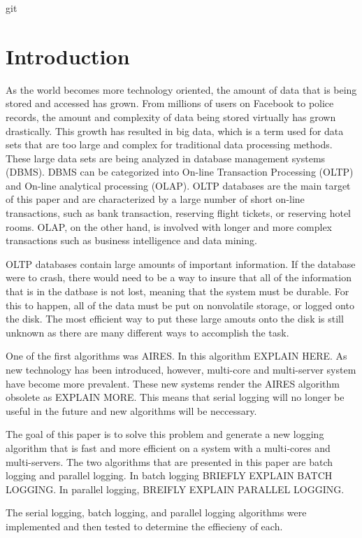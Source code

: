 git \section{Introduction}

As the world becomes more technology oriented, the amount of data that is being stored and accessed has grown. From millions of users on Facebook to police records, the amount and complexity of data being stored virtually has grown drastically. This growth has resulted in big data, which is a term used for data sets that are too large and complex for traditional data processing methods. These large data sets are being analyzed in database management systems (DBMS). DBMS can be categorized into On-line Transaction Processing (OLTP) and On-line analytical processing (OLAP). OLTP databases are the main target of this paper and are characterized by a large number of short on-line transactions, such as bank transaction, reserving flight tickets, or reserving hotel rooms. OLAP, on the other hand, is involved with longer and more complex transactions such as business intelligence and data mining. \newline

OLTP databases contain large amounts of important information. If the database were to crash, there would need to be a way to insure that all of the information that is in the datbase is not lost, meaning that the system must be durable. For this to happen, all of the data must be put on nonvolatile storage, or logged onto the disk. The most efficient way to put these large amouts onto the disk is still unknown as there are many different ways to accomplish the task. \newline

One of the first algorithms was AIRES. In this algorithm EXPLAIN HERE. As new technology has been introduced, however, multi-core and multi-server system have become more prevalent. These new systems render the AIRES algorithm obsolete as EXPLAIN MORE. This means that serial logging will no longer be useful in the future and new algorithms will be neccessary.  \newline

The goal of this paper is to solve this problem and generate a new logging algorithm that is fast and more efficient on a system with a multi-cores and multi-servers. The two algorithms that are presented in this paper are batch logging and parallel logging. In batch logging BRIEFLY EXPLAIN BATCH LOGGING. In parallel logging, BREIFLY EXPLAIN PARALLEL LOGGING. \newline

The serial logging, batch logging, and parallel logging algorithms were implemented and then tested to determine the effiecieny of each. 


  
